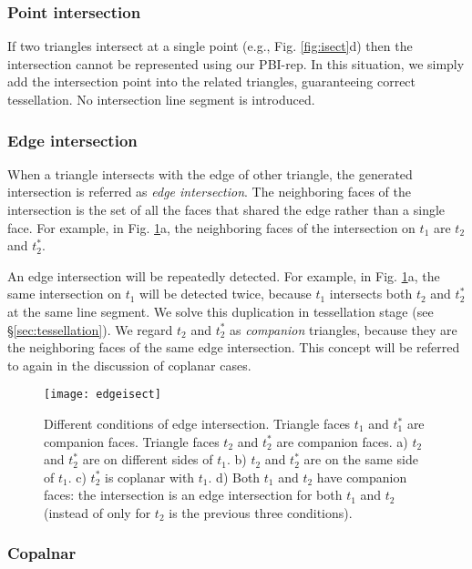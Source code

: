 \subsubsection{Point intersection}
\label{sec:ipoint}

If two triangles intersect at a single point (e.g., Fig. \ref{fig:isect}d) then the intersection cannot be represented using our PBI-rep. In this situation, we simply add the intersection point into the related triangles, guaranteeing correct tessellation. No intersection line segment is introduced.

\subsubsection{Edge intersection}


When a triangle intersects with the edge of other triangle, the generated intersection is referred as \emph{edge intersection}. The neighboring faces of the intersection is the set of all the faces that shared the edge rather than a single face. For example, in Fig. \ref{fig:twin}a, the neighboring faces of the intersection on $t_1$ are $t_2$ and $t^*_2$.

An edge intersection will be repeatedly detected. For example, in Fig. \ref{fig:twin}a, the same intersection on $t_1$ will be detected twice, because $t_1$ intersects both $t_2$ and $t_2^*$ at the same line segment. We solve this duplication in tessellation stage (see \S\ref{sec:tessellation}). We regard $t_2$ and $t_2^*$ as \emph{companion} triangles, because they are the neighboring faces of the same edge intersection. This concept will be referred to again in the discussion of coplanar cases.

\begin{figure}[t]
\centering
\texttt{[image: edgeisect]}
\caption{Different conditions of edge intersection. Triangle faces $t_1$ and $t_1^*$ are companion faces. Triangle faces $t_2$ and $t_2^*$ are companion faces. a) $t_2$ and $t_2^*$ are on different sides of $t_1$. b) $t_2$ and $t_2^*$ are on the same side of $t_1$. c) $t_2^*$ is coplanar with $t_1$. d) Both $t_1$ and $t_2$ have companion faces: the intersection is an edge intersection for both $t_1$ and $t_2$ (instead of only for $t_2$ is the previous three conditions). }
\label{fig:twin}
\end{figure}


\subsubsection{Copalnar}

